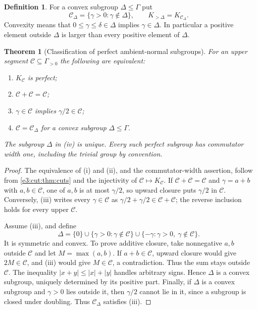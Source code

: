 \documentclass[11pt,letterpaper]{article}
\numberwithin{equation}{section}
\newtheorem{theorem}{Theorem}[section]
\theoremstyle{definition}
\newtheorem{definition}[definition]{Definition}
\theoremstyle{remark}
\begin{document}
\begin{definition}\label{e3:cut:def:convexcut}
For a convex subgroup $\Delta\le\Gamma$ put
\[
 \mathcal C_\Delta=\{\gamma>0:\gamma\notin\Delta\},\qquad
 K_{>\Delta}=K_{\mathcal C_\Delta}.
\]
Convexity means that $0\le\gamma\le\delta\in\Delta$ implies $\gamma\in\Delta$.
In particular a positive element outside $\Delta$ is larger than every
positive element of $\Delta$.
\end{definition}

\begin{theorem}[Classification of perfect ambient-normal subgroups]\label{e3:cut:thm:perfectcuts}
For an upper segment $\mathcal C\subseteq\Gamma_{>0}$ the following are
equivalent:
\begin{enumerate}[label=\textup{(\roman*)}]
\item $K_{\mathcal C}$ is perfect;
\item $\mathcal C+\mathcal C=\mathcal C$;
\item $\gamma\in\mathcal C$ implies $\gamma/2\in\mathcal C$;
\item $\mathcal C=\mathcal C_\Delta$ for a convex subgroup $\Delta\le\Gamma$.
\end{enumerate}
The subgroup $\Delta$ in \textup{(iv)} is unique. Every such perfect subgroup
has commutator width one, including the trivial group by convention.
\end{theorem}
\begin{proof}
The equivalence of (i) and (ii), and the commutator-width assertion, follow from
\cref{e3:cut:thm:cuts} and the injectivity of $\mathcal C\mapsto K_{\mathcal C}$.
If $\mathcal C+\mathcal C=\mathcal C$ and $\gamma=a+b$ with
$a,b\in\mathcal C$, one of $a,b$ is at most $\gamma/2$, so upward closure puts
$\gamma/2$ in $\mathcal C$. Conversely, (iii) writes every $\gamma\in\mathcal C$
as $\gamma/2+\gamma/2\in\mathcal C+\mathcal C$; the reverse inclusion holds for
every upper $\mathcal C$.

Assume (iii), and define
\[
 \Delta=\{0\}\cup\{\gamma>0:\gamma\notin\mathcal C\}
 \cup\{-\gamma:\gamma>0,\ \gamma\notin\mathcal C\}.
\]
It is symmetric and convex. To prove additive closure, take nonnegative $a,b$
outside $\mathcal C$ and let $M=\max(a,b)$. If $a+b\in\mathcal C$, upward
closure would give $2M\in\mathcal C$, and (iii) would give $M\in\mathcal C$, a
contradiction. Thus the sum stays outside $\mathcal C$. The inequality
$|x+y|\le|x|+|y|$ handles arbitrary signs. Hence $\Delta$ is a convex subgroup,
uniquely determined by its positive part. Finally, if $\Delta$ is a convex
subgroup and $\gamma>0$ lies outside it, then $\gamma/2$ cannot lie in it,
since a subgroup is closed under doubling. Thus $\mathcal C_\Delta$ satisfies
(iii).
\end{proof}
\end{document}
